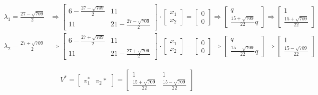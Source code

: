 \documentclass[a4paper, spanish]{article}
\begin{document}
  \begin{align}
    \lambda_1 = \frac{27 - \sqrt{709}}{2} &\Rightarrow
    \begin{bmatrix}
      6 - \frac{27 - \sqrt{709}}{2} & 11\\
      11 & 21 - \frac{27 - \sqrt{709}}{2}
    \end{bmatrix}
    \cdot
    \begin{bmatrix}
      x_1 \\
      x_2
    \end{bmatrix}
    =
    \begin{bmatrix}
      0 \\
      0
    \end{bmatrix}
    \Rightarrow
    \begin{bmatrix}
      q \\
      \frac{15 + \sqrt{709}}{22} q
    \end{bmatrix}
    \Rightarrow
    \begin{bmatrix}
      1 \\
      \frac{15 + \sqrt{709}}{22}
    \end{bmatrix} \\
    \lambda_2 = \frac{27 + \sqrt{709}}{2} &\Rightarrow
    \begin{bmatrix}
      6 - \frac{27 + \sqrt{709}}{2} & 11\\
      11 & 21 - \frac{27 + \sqrt{709}}{2}
    \end{bmatrix}
    \cdot
    \begin{bmatrix}
      x_1 \\
      x_2
    \end{bmatrix}
    =
    \begin{bmatrix}
      0 \\
      0
    \end{bmatrix}
    \Rightarrow
    \begin{bmatrix}
      q \\
      \frac{15 - \sqrt{709}}{22} q
    \end{bmatrix}
    \Rightarrow
    \begin{bmatrix}
      1 \\
      \frac{15 - \sqrt{709}}{22}
    \end{bmatrix}
  \end{align}


  \begin{align}
    V^* =
    \begin{bmatrix}
      v_1^* & v_2*
    \end{bmatrix} =
    \begin{bmatrix}
      1 & 1 \\
      \frac{15 + \sqrt{709}}{22}  & \frac{15 - \sqrt{709}}{22}
    \end{bmatrix}
  \end{align}
\end{document}
